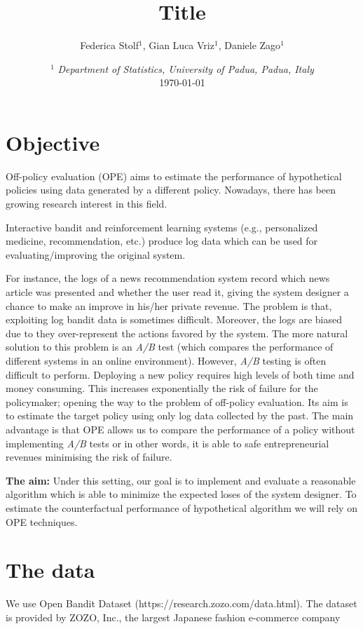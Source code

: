 \documentclass{article}
\author{Federica Stolf$ ^{1}$, Gian Luca Vriz$ ^{1}$, Daniele Zago$^1$}
\title{Title}
\date{%
\smaller
$^1$ \textit{Department of Statistics, University of Padua, Padua, Italy}\\%
\today}
\begin{document}
\maketitle

\section{Objective}

Off-policy evaluation (OPE) aims to estimate the performance of hypothetical policies using data generated by a different policy. Nowadays, there has been growing research interest in this field. 

Interactive bandit and reinforcement learning systems (e.g., personalized medicine, recommendation, etc.) produce log data which can be used for evaluating/improving the original system.

For instance, the logs of a news recommendation system record which news article was presented and whether the user read it, giving the system designer a chance to make an improve in his/her private revenue.
The problem is that, exploiting log bandit data is sometimes difficult. Moreover, the logs are biased due to they over-represent the actions favored by the system. The more natural solution to this problem is an \textit{A/B} test (which compares the performance of different systems in an online environment). However, \textit{A/B} testing is often difficult to perform. Deploying a new policy requires high levels of both time and money consuming. This increases exponentially the risk of failure for the policymaker; opening the way to the problem of off-policy evaluation. Its aim is to estimate the target policy using only log data collected by the past. The main advantage is that OPE allows us to compare the performance of a policy without implementing \textit{A/B} tests or in other words, it is able to safe entrepreneurial revenues minimising the risk of failure. 

\textbf{The aim:} Under this setting, our goal is to implement and evaluate a reasonable algorithm which is able to minimize the expected loses of the system designer. To estimate the counterfactual performance of hypothetical algorithm we will rely on OPE techniques.
\section{The data}

We use Open Bandit Dataset (https://research.zozo.com/data.html). The dataset is provided by ZOZO, Inc., the largest Japanese fashion e-commerce company 
\end{document}

